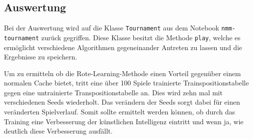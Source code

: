 \documentclass[11pt]{article}
\begin{document}
    \hypertarget{auswertung}{%
\subsection{Auswertung}\label{auswertung}}

Bei der Auswertung wird auf die Klasse \texttt{Tournament} aus dem
Notebook \texttt{nmm-tournament} zurück gegriffen. Diese Klasse besitzt
die Methode \texttt{play}, welche es ermöglicht verschiedene Algorithmen
gegeneinander Antreten zu lassen und die Ergebnisse zu speichern.

Um zu ermitteln ob die Rote-Learning-Methode einen Vorteil gegenüber
einem normalen Cache bietet, tritt eine über 100 Spiele trainierte
Trainspositionstabelle gegen eine untrainierte Transpositionstabelle an.
Dies wird zehn mal mit verschiedenen Seeds wiederholt. Das verändern der
Seeds sorgt dabei für einen veränderten Spielverlauf. Somit sollte
ermittelt werden können, ob durch das Training eine Verbesserung der
künstlichen Intelligenz eintritt und wenn ja, wie deutlich diese
Verbesserung ausfällt.
\end{document}
